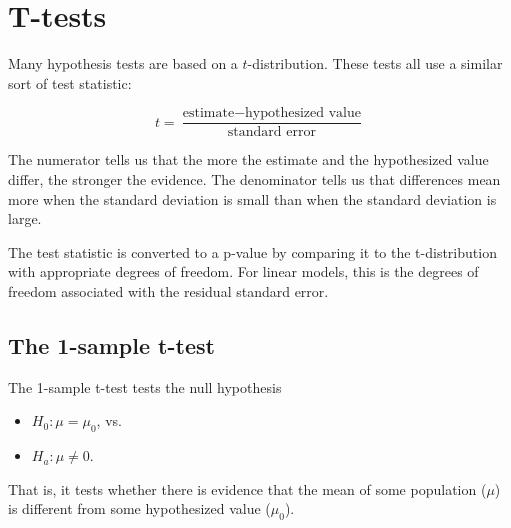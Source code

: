 \documentclass[twoside]{book}\usepackage[]{graphicx}\usepackage[]{xcolor}
\begin{document}
\section{T-tests}

Many hypothesis tests are based on a $t$-distribution.  These tests all use a similar sort
of test statistic:

\[
t = \frac{\mbox{estimate} - \mbox{hypothesized value}}{\mbox{standard error}}
\]

The numerator tells us that the more the estimate and the hypothesized value differ, 
the stronger the evidence.  The denominator tells us that differences mean more when the standard
deviation is small than when the standard deviation is large.

The test statistic is converted to a p-value by comparing it to the t-distribution with appropriate
degrees of freedom.  For linear models, this is the degrees of freedom associated with the 
residual standard error.

\subsection{The 1-sample t-test}
The 1-sample t-test tests the null hypothesis
\begin{itemize}
	\item $H_0: \mu = \mu_0$, vs.
	\item $H_a: \mu \neq 0$.
\end{itemize}
That is, it tests whether there is evidence that the mean of some population ($\mu$) is different
from some hypothesized value ($\mu_0$).
\end{document}
